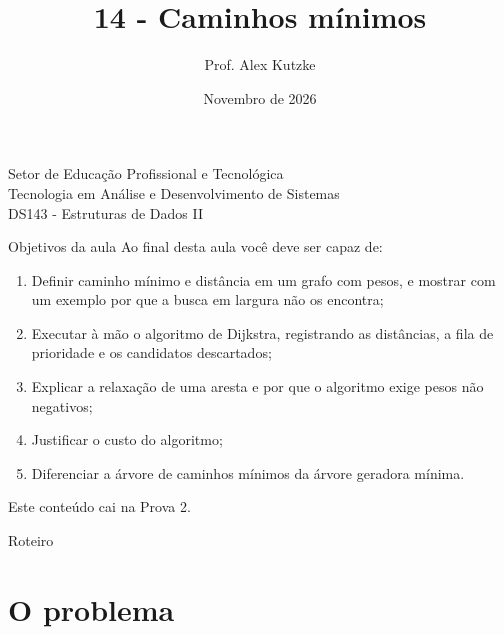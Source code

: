 \documentclass{beamer}
\title{14 - Caminhos mínimos}
\author{Prof. Alex Kutzke}
\date{Novembro de 2026}
\begin{document}
\begin{frame}
	\begin{center}
		\large{Setor de Educação Profissional e Tecnológica}\\
		Tecnologia em Análise e Desenvolvimento de Sistemas\\
		\vspace{1cm}
		\small{DS143 - Estruturas de Dados II}
	\end{center}
	\titlepage
\end{frame}

\begin{frame}{Objetivos da aula}
	\footnotesize
	Ao final desta aula você deve ser capaz de:
	\begin{enumerate}
		\item Definir caminho mínimo e distância em um grafo com pesos, e mostrar
		      com um exemplo por que a busca em largura não os encontra;
		\item Executar à mão o algoritmo de Dijkstra, registrando as distâncias,
		      a fila de prioridade e os candidatos descartados;
		\item Explicar a relaxação de uma aresta e por que o algoritmo exige pesos
		      não negativos;
		\item Justificar o custo do algoritmo;
		\item Diferenciar a árvore de caminhos mínimos da árvore geradora mínima.
	\end{enumerate}
	\vspace{0.1cm}
	Este conteúdo cai na Prova 2.
\end{frame}

\begin{frame}{Roteiro}
	\tableofcontents
\end{frame}

\section{O problema}
\end{document}
